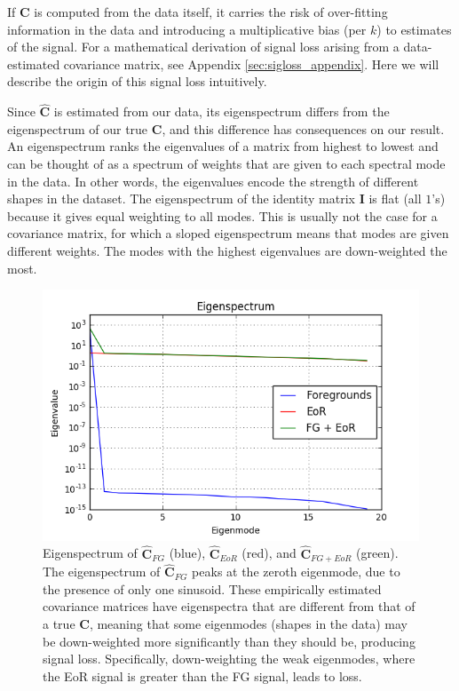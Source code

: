 \documentclass[preprint2,numberedappendix,tighten]{aastex6}  %
\begin{document}
If $\textbf{C}$ is computed from the data itself, it carries the risk of over-fitting information in the data and introducing a 
multiplicative bias (per $k$) to estimates of the signal. For a mathematical derivation of signal loss arising from a data-estimated covariance matrix, see Appendix \ref{sec:sigloss_appendix}. Here we will describe the origin of this signal loss 
intuitively.

Since $\hat{\textbf{C}}$ is estimated from our data, its eigenspectrum differs from the eigenspectrum of our 
true $\textbf{C}$, and this difference has consequences on our result. An eigenspectrum ranks the eigenvalues of a matrix from 
highest to lowest and can be thought of as a spectrum of weights that are given to each spectral mode in the data. In other 
words, the eigenvalues encode the strength of different shapes in the dataset. The eigenspectrum of the identity matrix $
\textbf{I}$ is flat (all $1$'s) because it gives equal weighting to all modes. This is usually not the case for a covariance matrix, 
for which a sloped eigenspectrum means that modes are given different weights. The modes with the highest eigenvalues are 
down-weighted the most. 

\begin{figure}
	\centering
	\includegraphics[trim={0.3cm 0cm 0.3cm 0.3cm},clip,width=\columnwidth]{plots/toy_sigloss2.png}
	\caption{Eigenspectrum of $\hat{\textbf{C}}_{FG}$ (blue), $\hat{\textbf{C}}_{EoR}$ (red), and $\hat{\textbf{C}}_{FG+EoR}$ 
(green). The eigenspectrum of $\hat{\textbf{C}}_{FG}$ peaks at the zeroth eigenmode, due to the presence of only one 
sinusoid. These empirically estimated covariance matrices have eigenspectra that are different from that of a true $\textbf{C}$, 
meaning that some eigenmodes (shapes in the data) may be down-weighted more significantly than they should be, producing 
signal loss. Specifically, down-weighting the weak eigenmodes, where the EoR signal is greater than the FG signal, leads to 
loss.}
	\label{fig:toy_sigloss2}
\end{figure}
\end{document}
